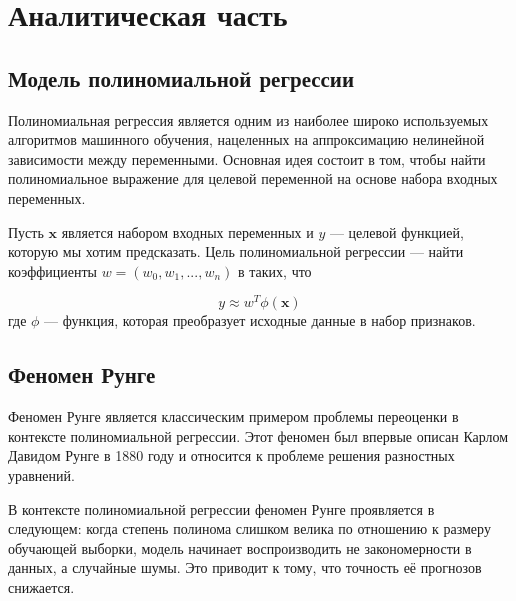 \chapter{Аналитическая часть}



\section{Модель полиномиальной регрессии}

Полиномиальная регрессия является одним из наиболее широко используемых алгоритмов машинного обучения, нацеленных на аппроксимацию нелинейной зависимости между переменными. Основная 
идея состоит в том, чтобы найти полиномиальное выражение для целевой переменной на основе набора входных переменных.

Пусть $\mathbf{x}$ является набором входных переменных и $y$ — целевой функцией, которую мы хотим предсказать. Цель полиномиальной регрессии — найти коэффициенты $w = (w_0, w_1, ..., 
w_n)$ в таких, что

$$y \approx w^T\phi(\mathbf{x})$$где $\phi$ — функция, которая преобразует исходные данные в набор признаков.



\section{Феномен Рунге}

Феномен Рунге является классическим примером проблемы переоценки в контексте полиномиальной регрессии. Этот феномен был впервые описан Карлом Давидом Рунге в 1880 году и относится 
к проблеме решения разностных уравнений.

В контексте полиномиальной регрессии феномен Рунге проявляется в следующем: когда степень полинома слишком велика по отношению к размеру обучающей выборки, модель начинает 
воспроизводить не закономерности в данных, а случайные шумы. Это приводит к тому, что точность её прогнозов снижается.

\clearpage
